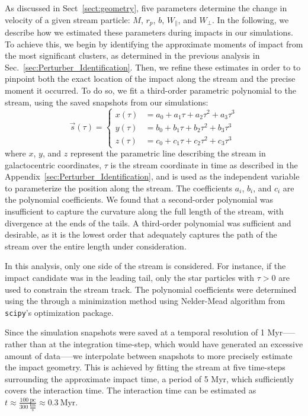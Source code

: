 \documentclass[draft]{aa}
\begin{document}
\begin{appendix}
    As discussed in Sect~\ref{sect:geometry},  five parameters determine the change in velocity of a given stream particle: $M$, $r_p$, $b$, $W_\parallel$, and $W_\perp$. In the following, we describe how we estimated these parameters during impacts in our simulations.
    To achieve this, we begin by identifying the approximate moments of impact from the most significant clusters, as determined in the previous analysis in Sec.~\ref{sec:Perturber_Identification}. Then, we refine these estimates in order to to pinpoint both the exact location of the impact along the stream and the precise moment it occurred. To do so, we fit a third-order parametric polynomial to the stream, using the saved snapshots from our simulations:
      \begin{equation}
        \vec{s}(\tau) = 
        \left\{
          \begin{aligned}
            x(\tau) &= a_0 + a_1 \tau + a_2 \tau^2 + a_3 \tau^3 \\ 
            y(\tau) &= b_0 + b_1 \tau + b_2 \tau^2 + b_3 \tau^3 \\
            z(\tau) &= c_0 + c_1 \tau + c_2 \tau^2 + c_3 \tau^3
          \end{aligned}
        \right.
        \end{equation}  
      where $x$, $y$, and $z$ represent the parametric line describing the stream in galactocentric coordinates, $\tau$ is the stream coordinate in time as described in the Appendix~\ref{sec:Perturber_Identification}, and is used as the independent variable to parameterize the position along the stream. The coefficients $a_i$, $b_i$, and $c_i$ are the polynomial coefficients. We found that a second-order polynomial was insufficient to capture the curvature along the full length of the stream, with divergence at the ends of the tails. A third-order polynomial was sufficient and desirable, as it is the lowest order that adequately captures the path of the stream over the entire length under consideration.

      In this analysis, only one side of the stream is considered. For instance, if the impact candidate was in the leading tail, only the star particles with $\tau > 0$ are used to constrain the stream track. The polynomial coefficients were determined using the through a minimization method using Nelder-Mead algorithm from \texttt{scipy}'s optimization package.

      Since the simulation snapshots were saved at a temporal resolution of 1 Myr--—rather than at the integration time-step, which would have generated an excessive amount of data—--we interpolate between snapshots to more precisely estimate the impact geometry. This is achieved by fitting the stream at five time-steps surrounding the approximate impact time, a period of 5 Myr, which sufficiently covers the interaction time. The interaction time can be estimated as $t \approx \frac{100~\text{pc}}{300~\frac{\text{km}}{\text{s}}} \approx 0.3~\text{Myr}$.


\end{appendix}
\end{document}
